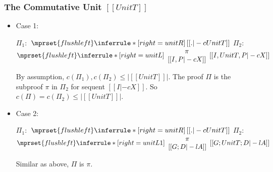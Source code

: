 \subsubsection{The Commutative Unit $[[UnitT]]$}
\begin{itemize}
\item Case 1:
      \begin{center}
        \scriptsize
        $\Pi_1:$
        \begin{math}
          $$\mprset{flushleft}
          \inferrule* [right={\tiny unitR}] {
            \,
          }{[[. |-c UnitT]]}
        \end{math}
        \qquad\qquad
        $\Pi_2:$
        \begin{math}
          $$\mprset{flushleft}
          \inferrule* [right={\tiny unitL}] {
            {
              \begin{array}{c}
                \pi \\
                {[[I, P |-c X]]}
              \end{array}
            }
          }{[[I, UnitT, P |-c X]]}
        \end{math}
      \end{center}
      By assumption, $c(\Pi_1),c(\Pi_2)\leq |[[UnitT]]|$. The proof $\Pi$
      is the subproof $\pi$ in $\Pi_2$ for sequent $[[I |-c X]]$. So
      $c(\Pi)=c(\Pi_2)\leq |[[UnitT]]|$.

\item Case 2:
      \begin{center}
        \scriptsize
        $\Pi_1:$
        \begin{math}
          $$\mprset{flushleft}
          \inferrule* [right={\tiny unitR}] {
            \,
          }{[[. |-c UnitT]]}
        \end{math}
        \qquad\qquad
        $\Pi_2:$
        \begin{math}
          $$\mprset{flushleft}
          \inferrule* [right={\tiny unitL1}] {
            {
              \begin{array}{c}
                \pi \\
                {[[G; D |-l A]]}
              \end{array}
            }
          }{[[G; UnitT; D |-l A]]}
        \end{math}
      \end{center}
      Similar as above, $\Pi$ is $\pi$.
\end{itemize}


